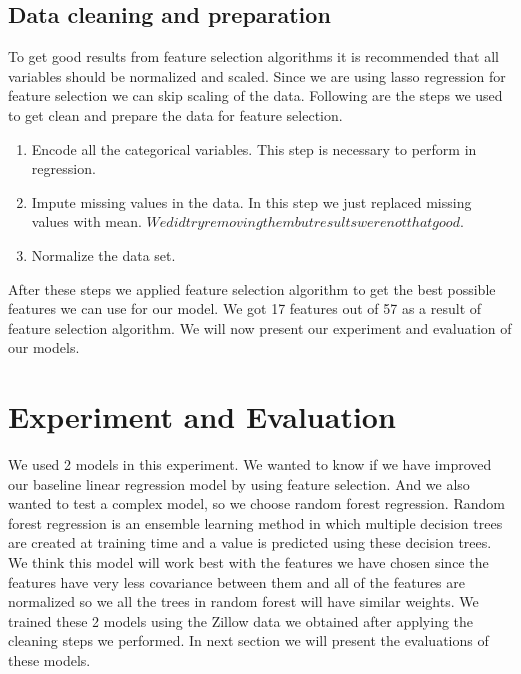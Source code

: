 \documentclass[a4paper, 11pt]{article}
\begin{document}
\subsection{Data cleaning and preparation}
To get good results from feature selection algorithms it is recommended that all variables should be normalized and scaled. Since we are using lasso regression for feature selection we can skip scaling of the data. Following are the steps we used to get clean and prepare the data for feature selection.
\begin{enumerate}
\item Encode all the categorical variables. This step is necessary to perform in regression.
\item Impute missing values in the data. In this step we just replaced missing values with mean. \(We did try removing them but results were not that good\).
\item Normalize the data set.

\end{enumerate}
After these steps we applied feature selection algorithm to get the best possible features we can use for our model. We got 17 features out of 57 as a result of feature selection algorithm. We will now present our experiment and evaluation of our models.
\section{Experiment and Evaluation}
We used 2 models in this experiment. We wanted to know if we have improved our baseline linear regression model by using feature selection. And we also wanted to test a complex model, so we choose random forest regression. Random forest regression is an ensemble learning method in which multiple decision trees are created at training time and a value is predicted using these decision trees. We think this model will work best with the features we have chosen since the features have very less covariance between them and all of the features are normalized so we all the trees in random forest will have similar weights. We trained these 2 models using the Zillow data we obtained after applying the cleaning steps we performed. In next section we will present the evaluations of these models.
\end{document}

